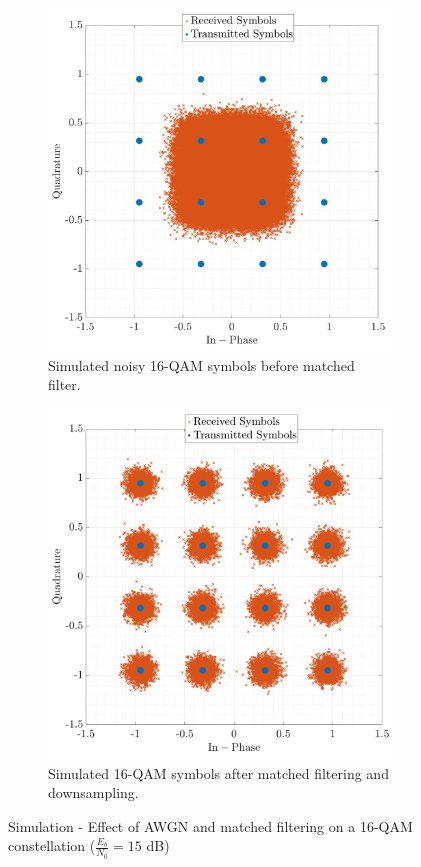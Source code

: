 \begin{figure}[H]
    \centering
    \begin{subfigure}{0.48\textwidth}
        \includegraphics[width=\linewidth]{Images/const-noisy.png}
        \caption{Simulated noisy 16-QAM symbols before matched filter.}
        \label{fig:const-noisy_cont}
    \end{subfigure}\hfill
    \begin{subfigure}{0.48\textwidth}
        \includegraphics[width=\linewidth]{Images/const-filtered-down.png} 
        \caption{Simulated 16-QAM symbols after matched filtering and downsampling.}
        \label{fig:const-filtered-down_cont}
    \end{subfigure}
    \caption{Simulation - Effect of AWGN and matched filtering on a 16-QAM constellation ($\frac{E_b}{N_0} = 15$ dB)}
    \label{fig:constellations-noise_cont}
\end{figure}
